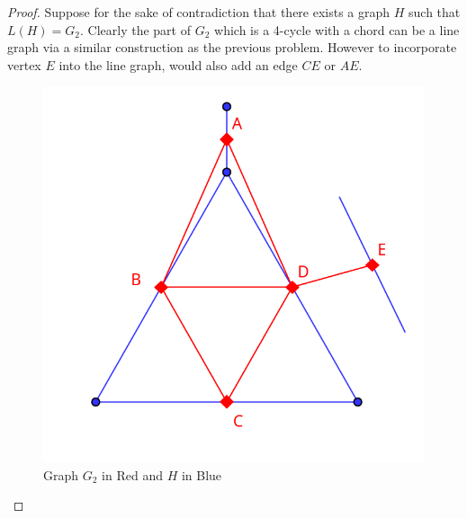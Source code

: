 \documentclass[12pt]{article}
\begin{document}
\begin{enumerate}
\begin{enumerate}
	\begin{proof} 
		Suppose for the sake of contradiction that there exists a graph $H$ such that $L(H) = G_2$. Clearly the part of $G_2$ which is a 4-cycle with a chord can be a line graph via a similar construction as the previous problem. However to incorporate vertex $E$ into the line graph, would also add an edge $CE$ or $AE$. 
		\begin{figure}[H]
			\begin{center}
				\caption{Graph $G_2$ in Red and $H$ in Blue}
				\includegraphics[width=.40\textwidth]{ClawLineGraph.png}
			\end{center}
		\end{figure}



	\end{proof}
	
	
	\end{enumerate}
\end{enumerate}
\end{document}
